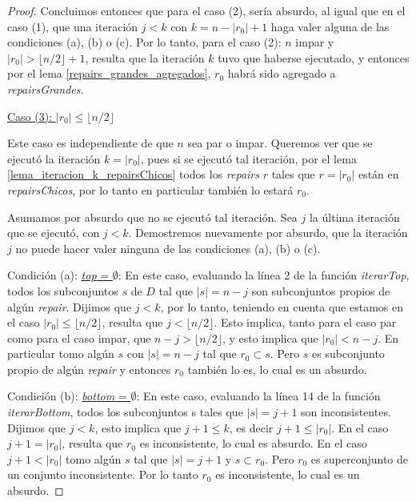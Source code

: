 \documentclass[11pt,a4paper,twoside]{tesis}
\newcommand{\parteEntera}{\lfloor n/2 \rfloor}
\begin{document}
\begin{proof}
Concluimos entonces que para el caso (2), sería absurdo, al igual que en el caso (1), que una iteración $j<k$ con $k = n - |r_0| + 1$ haga valer alguna de las condiciones (a), (b) o (c). Por lo tanto, para el caso (2): $n$ impar y $|r_0| > \parteEntera + 1$, resulta que la iteración $k$ tuvo que haberse ejecutado, y entonces por el lema \ref{repairs_grandes_agregados}, $r_0$ habrá sido agregado a \textit{repairsGrandes}.

\begin{center}
\underline{Caso (3): $|r_0| \leq \parteEntera$}
\end{center}

Este caso es independiente de que $n$ sea par o impar. Queremos ver que se ejecutó la iteración $k = |r_0|$, pues si se ejecutó tal iteración, por el lema \ref{lema_iteracion_k_repairsChicos} todos los \textit{repairs} $r$ tales que $r = |r_0|$ están en \textit{repairsChicos}, por lo tanto en particular también lo estará $r_0$.

Asumamos por absurdo que no se ejecutó tal iteración. Sea $j$ la última iteración que se ejecutó, con $j<k$. Demostremos nuevamente por absurdo, que la iteración $j$ no puede hacer valer ninguna de las condiciones (a), (b) o (c).

Condición (a): \underline{\textit{top} = $\emptyset$}: En este caso, evaluando la línea 2 de la función \textit{iterarTop}, todos los subconjuntos $s$ de $D$ tal que $|s| = n - j$ son subconjuntos propios de algún \textit{repair}. Dijimos que $j < k$, por lo tanto, teniendo en cuenta que estamos en el caso $|r_0| \leq \parteEntera$, resulta que $j < \parteEntera$. Esto implica, tanto para el caso par como para el caso impar, que $n - j > \parteEntera$, y esto implica que $|r_0| < n - j$. En particular tomo algún $s$ con $|s| = n - j$ tal que $r_0 \subset s$. Pero $s$ es subconjunto propio de algún \textit{repair} y entonces $r_0$ también lo es, lo cual es un absurdo.

Condición (b): \underline{\textit{bottom} = $\emptyset$}: En este caso, evaluando la línea 14 de la función \textit{iterarBottom}, todos los subconjuntos s tales que $|s| = j + 1$ son inconsistentes. Dijimos que $j<k$, esto implica que $j + 1 \leq k$, es decir $j + 1 \leq |r_0|$. En el caso $j + 1 = |r_0|$, resulta que $r_0$ es inconsistente, lo cual es absurdo. En el caso  $j + 1 < |r_0|$ tomo algún $s$ tal que $|s| = j + 1$ y $s \subset r_0$. Pero $r_0$ es superconjunto de un conjunto inconsistente. Por lo tanto $r_0$ es inconsistente, lo cual es un absurdo.


\end{proof}
\end{document}
